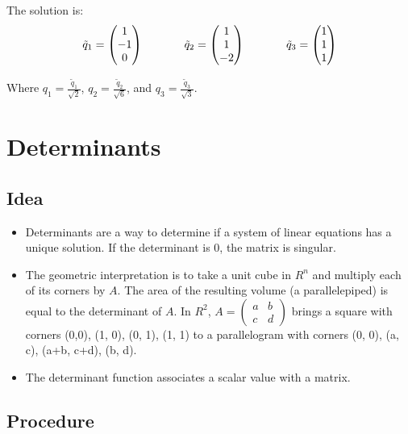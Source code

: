 \documentclass[12pt]{article}
\begin{document}
\begin{itemize}
The solution is:
\begin{equation*}
\tilde{q}_1 = \begin{pmatrix}1\\-1\\0\end{pmatrix} \hspace{.5in}
\tilde{q}_2 = \begin{pmatrix}1\\1\\-2\end{pmatrix} \hspace{.5in}
\tilde{q}_3 = \begin{pmatrix}1\\1\\1\end{pmatrix}
\end{equation*}

Where $q_1 = \frac{\tilde{q}_1}{\sqrt{2}}$, $q_2 = \frac{\tilde{q}_2}{\sqrt{6}}$, and $q_3 = \frac{\tilde{q}_3}{\sqrt{3}}$.

\section{Determinants}
\subsection{Idea}
\begin{itemize}
\item Determinants are a way to determine if a system of linear equations has a unique solution. If the determinant is 0, the matrix is singular.

\item The geometric interpretation is to take a unit cube in $R^n$ and multiply each of its corners by $A$.  The area of the resulting volume (a parallelepiped) is equal to the determinant of $A$. In $R^2$, $A = \begin{pmatrix}a & b \\ c & d \end{pmatrix}$ brings a square with corners (0,0), (1, 0), (0, 1), (1, 1) to a parallelogram with corners (0, 0), (a, c), (a+b, c+d), (b, d).

\item The determinant function associates a scalar value with a matrix.
\end{itemize}

\subsection{Procedure}

\end{itemize}
\end{document}
